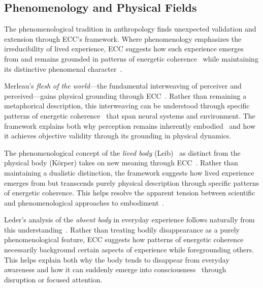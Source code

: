 \subsection*{Phenomenology and Physical Fields}

The phenomenological tradition in anthropology finds unexpected validation and extension through ECC's framework. Where phenomenology emphasizes the irreducibility of lived experience, ECC suggests how such experience emerges from and remains grounded in patterns of energetic coherence~ while maintaining its distinctive phenomenal character~\cite{merleau2012phenomenology,csordas1994embodiment}.

Merleau's \textit{flesh of the world}—the fundamental interweaving of perceiver and perceived—gains physical grounding through ECC~\cite{merleau1968visible}. Rather than remaining a metaphorical description, this interweaving can be understood through specific patterns of energetic coherence~ that span neural systems and environment. The framework explains both why perception remains inherently embodied~ and how it achieves objective validity through its grounding in physical dynamics.

The phenomenological concept of the \textit{lived body} (Leib)~ as distinct from the physical body (Körper) takes on new meaning through ECC~\cite{csordas1994embodiment,jackson1989knowledge}. Rather than maintaining a dualistic distinction, the framework suggests how lived experience emerges from but transcends purely physical description through specific patterns of energetic coherence. This helps resolve the apparent tension between scientific and phenomenological approaches to embodiment~.

Leder's analysis of the \textit{absent body} in everyday experience follows naturally from this understanding~\cite{leder1990absent}. Rather than treating bodily disappearance as a purely phenomenological feature, ECC suggests how patterns of energetic coherence~ necessarily background certain aspects of experience while foregrounding others. This helps explain both why the body tends to disappear from everyday awareness and how it can suddenly emerge into consciousness~ through disruption or focused attention.

